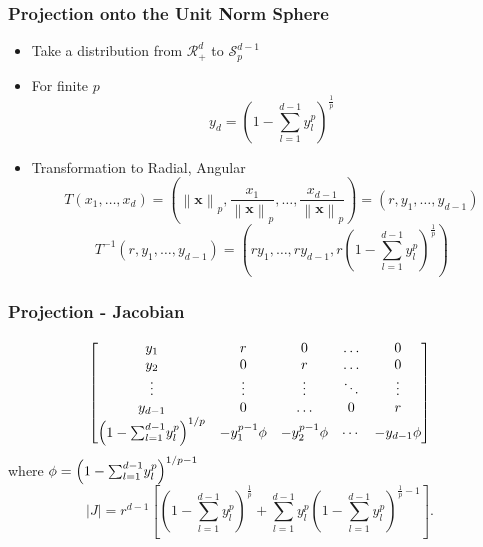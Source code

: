\documentclass[aspectratio=169]{beamer}
\newcommand{\norm}[1]{\left\lVert #1 \right\rVert}
\newcommand{\pnorm}[2]{\norm{#1}_{#2}}
\begin{document}
\begin{frame}
  \frametitle{Projection onto the Unit Norm Sphere}
  \begin{itemize}
    \item Take a distribution from $\mathcal{R}_+^{d}$ to $\mathcal{S}_{p}^{d-1}$
    \pause
    \item For finite $p$
      \begin{equation*}
        y_d = \left(1 - {\textstyle\sum}_{l = 1}^{d-1}y_l^p\right)^{\frac{1}{p}}
      \end{equation*}
    \pause
    \item Transformation to Radial, Angular
    \begin{equation*}
      T(x_1,\ldots,x_d) = \left(\pnorm{\bm{x}}{p}, \frac{x_1}{\pnorm{\bm{x}}{p}},
                    \ldots , \frac{x_{d-1}}{\pnorm{\bm{x}}{p}}\right) = (r,y_1,\ldots,y_{d-1})
    \end{equation*}
    \pause
    \begin{equation*}
    T^{-1}\left(r,y_1,\ldots,y_{d-1}\right) =
      \left(ry_1,\ldots,ry_{d-1}, r\left(1 - {\textstyle\sum}_{l = 1}^{d-1}y_l^p\right)^{\frac{1}{p}}\right)
    \end{equation*}
  \end{itemize}
\end{frame}

\begin{frame}
  \frametitle{Projection - Jacobian}
  \begin{equation*}
    \begin{bmatrix}
      y_1 & r & 0 & \ldots & 0\\
      y_2 & 0 & r & \ldots & 0\\
      \vdots & \vdots & \vdots & \ddots & \vdots\\
      y_{d-1} & 0 & \ldots & 0 & r \\
      \left(1 - {\scriptsize\sum_{l=1}^{d-1}}y_l^p\right)^{1/p} &
        - y_1^{p-1}\phi & -y_2^{p-1}\phi & \cdots & -y_{d-1}\phi
    \end{bmatrix}
  \end{equation*}
  where $\phi = \left(1 - {\scriptsize\sum_{l=1}^{d-1}}y_l^p\right)^{1/p - 1}$
  \pause
  \begin{equation*}
  \lvert J \rvert = r^{d-1}\left[\left(1 - {\textstyle\sum}_{l = 1}^{d-1}y_l^p\right)^{\frac{1}{p}} +
      {\textstyle\sum}_{l = 1}^{d-1}y_l^p\left(1 - {\textstyle\sum}_{l=1}^{d-1}
          y_l^p\right)^{\frac{1}{p} - 1}\right].
  \end{equation*}
\end{frame}
\end{document}
